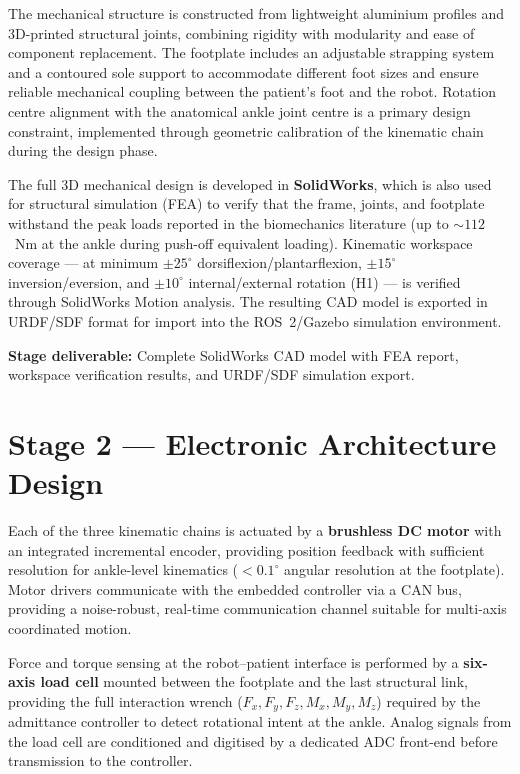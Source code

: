 The mechanical structure is constructed from lightweight aluminium profiles and 3D-printed structural joints, combining rigidity with modularity and ease of component replacement.
The footplate includes an adjustable strapping system and a contoured sole support to accommodate different foot sizes and ensure reliable mechanical coupling between the patient's foot and the robot.
Rotation centre alignment with the anatomical ankle joint centre is a primary design constraint, implemented through geometric calibration of the kinematic chain during the design phase.

The full 3D mechanical design is developed in \textbf{SolidWorks}, which is also used for structural simulation (FEA) to verify that the frame, joints, and footplate withstand the peak loads reported in the biomechanics literature (up to $\sim112$~Nm at the ankle during push-off equivalent loading).
Kinematic workspace coverage — at minimum $\pm25^{\circ}$ dorsiflexion/plantarflexion, $\pm15^{\circ}$ inversion/eversion, and $\pm10^{\circ}$ internal/external rotation (H1) — is verified through SolidWorks Motion analysis.
The resulting CAD model is exported in URDF/SDF format for import into the ROS~2/Gazebo simulation environment.

\textbf{Stage deliverable:} Complete SolidWorks CAD model with FEA report, workspace verification results, and URDF/SDF simulation export.

\section{Stage 2 — Electronic Architecture Design}

Each of the three kinematic chains is actuated by a \textbf{brushless DC motor} with an integrated incremental encoder, providing position feedback with sufficient resolution for ankle-level kinematics ($<0.1^{\circ}$ angular resolution at the footplate).
Motor drivers communicate with the embedded controller via a CAN bus, providing a noise-robust, real-time communication channel suitable for multi-axis coordinated motion.

Force and torque sensing at the robot--patient interface is performed by a \textbf{six-axis load cell} mounted between the footplate and the last structural link, providing the full interaction wrench ($F_x, F_y, F_z, M_x, M_y, M_z$) required by the admittance controller to detect rotational intent at the ankle.
Analog signals from the load cell are conditioned and digitised by a dedicated ADC front-end before transmission to the controller.

